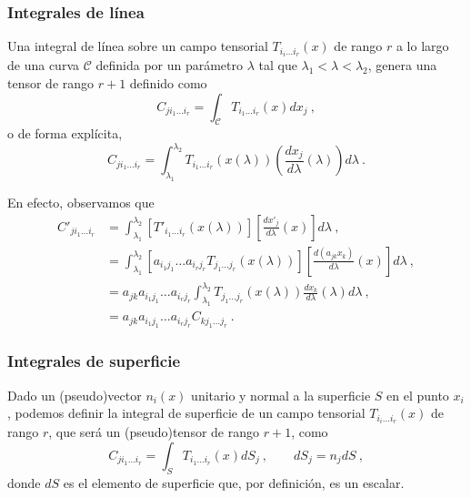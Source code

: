 \subsubsection*{Integrales de línea}

Una integral de línea sobre un campo tensorial $T_{i_i \dots i_r}(x)$ de rango $r$ a lo largo de una curva $\mathcal{C}$ definida por un parámetro $\lambda$ tal que $\lambda_1 < \lambda < \lambda_2$, genera una tensor de rango $r+1$ definido como
\begin{equation}
    C_{j i_1 \dots i_r} = \int_{\mathcal{C}} T_{i_1 \dots i_r} (x) dx_j \ ,
\end{equation}
o de forma explícita,
\begin{equation}
    C_{j i_1 \dots i_r} =  \int_{\lambda_1}^{\lambda_2} T_{i_1 \dots i_r}(x(\lambda)) \left(\frac{dx_j}{d\lambda}(\lambda) \right) d\lambda \ .
\end{equation}

En efecto, observamos que
\begin{align}
    C'_{j i_1 \dots i_r} & = \int_{\lambda_1}^{\lambda_2} [T'_{i_1 \dots i_r}(x(\lambda))] \left[ \frac{dx'_j}{d\lambda}(x) \right] d\lambda \ , \\
    & = \int_{\lambda_1}^{\lambda_2} [a_{i_1 j_1} \dots a_{i_r j_r} T_{j_1 \dots j_r}(x(\lambda))] \left[ \frac{d(a_{jk}x_k)}{d\lambda}(x) \right] d\lambda \ , \\
    & = a_{jk} a_{i_1 j_1} \dots a_{i_r j_r} \int_{\lambda_1}^{\lambda_2} T_{j_1 \dots j_r}(x(\lambda)) \frac{dx_k}{d\lambda}(\lambda) d\lambda \ , \\
    & = a_{jk} a_{i_1 j_1} \dots a_{i_r j_r} C_{k j_1 \dots j_r} \ .
\end{align}

\subsubsection*{Integrales de superficie}

Dado un (pseudo)vector $n_i(x)$ unitario y normal a la superficie $S$ en el punto $x_i$, podemos definir la integral de superficie de un campo tensorial $T_{i_i \dots i_r}(x)$ de rango $r$, que será un (pseudo)tensor de rango $r+1$, como
\begin{equation}
    C_{j i_1 \dots i_r} = \int_S T_{i_1 \dots i_r} (x) dS_j \ , \qquad dS_j = n_j dS \ ,
\end{equation}
donde $dS$ es el elemento de superficie que, por definición, es un escalar.

